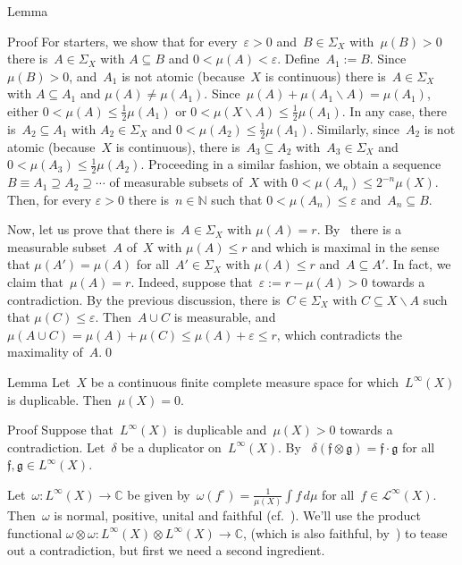 \documentclass[a]{subfiles}
\begin{document}
\begin{parsec}
\begin{point}{Lemma}
\begin{point}{Proof}
For starters, we show that for every~$\varepsilon >0$
and~$B\in\Sigma_X$ with~$\mu(B)>0$
there is~$A\in\Sigma_X$ with $A\subseteq B$
and  $0<\mu(A)<\varepsilon$.
Define~$A_1 := B$.
Since~$\mu(B)>0$,
and~$A_1$ is not atomic (because~$X$ is continuous)
there is~$A\in\Sigma_X$ with $A\subseteq A_1$ 
and $\mu(A)\neq \mu(A_1)$.
Since~$\mu(A)+\mu(A_1\backslash A)=\mu(A_1)$,
either $0<\mu(A)\leq \frac{1}{2}\mu(A_1)$
or $0<\mu(X\backslash A)\leq \frac{1}{2}\mu(A_1)$.
In any case,
there is~$A_2\subseteq A_1$
with $A_2\in\Sigma_X$
and $0<\mu(A_2)\leq \frac{1}{2}\mu(A_1)$.
Similarly,
since~$A_2$ is not atomic (because~$X$ is continuous),
there is~$A_3\subseteq A_2$
with~$A_3\in\Sigma_X$ and $0<\mu(A_3)\leq \frac{1}{2}\mu(A_2)$.
Proceeding in a similar fashion,
we obtain a sequence $B\equiv A_1 \supseteq A_2\supseteq \dotsb$
of measurable subsets of~$X$
with $0<\mu(A_n)\leq 2^{-n}\mu(X)$.
Then, for every $\varepsilon >0$
there is~$n\in\mathbb{N}$
such that $0<\mu(A_n)\leq \varepsilon$ and~$A_n\subseteq B$.

Now, 
let us prove that there is~$A\in\Sigma_X$ with $\mu(A)=r$.
By~
there is a measurable
subset~$A$ of~$X$
with $\mu(A)\leq r$
and which is maximal
in the sense that $\mu(A')=\mu(A)$
for all~$A'\in\Sigma_X$
with $\mu(A)\leq r$ and~$A\subseteq A'$.
In fact, we claim that~$\mu(A)=r$.
Indeed, suppose that~$\varepsilon := r-\mu(A)>0$
towards a contradiction.
By the previous discussion,
there is~$C\in\Sigma_X$ with $C\subseteq X\backslash A$
such that $\mu(C)\leq \varepsilon$.
Then~$A\cup C$ is measurable,
and $\mu(A\cup C)=\mu(A)+\mu(C)\leq \mu(A)+\varepsilon\leq r$,
which contradicts the maximality of~$A$.\qed
\end{point}
\end{point}
\begin{point}{Lemma}%
Let~$X$ be a continuous finite complete measure space
for which~$L^\infty(X)$ is duplicable.
Then~$\mu(X)=0$.
\begin{point}{Proof}%
Suppose that~$L^\infty(X)$ is duplicable
and~$\mu(X)>0$
towards a contradiction.
Let~$\delta$
be a duplicator
on~$L^\infty(X)$.
By~
$\delta(\mathfrak{f}\otimes \mathfrak{g})=
\mathfrak{f}\cdot \mathfrak{g}$ for 
all~$\mathfrak{f},\mathfrak{g}\in L^\infty(X)$.

Let~$\omega\colon L^\infty(X)\to \mathbb{C}$
be given by~$\omega(f^\circ)=\frac{1}{\mu(X)}\int f \,d\mu$
for all~$f\in \mathcal{L}^\infty(X)$.
Then~$\omega$ is normal, positive, unital and faithful
(cf.~).
We'll use
the product
functional 
$\omega\otimes \omega\colon L^\infty(X)\otimes L^\infty(X)\to \mathbb{C}$,
(which is also faithful,
by~)
to tease out a contradiction,
but first we  need a second ingredient.


\end{point}
\end{point}
\end{parsec}
\end{document}
